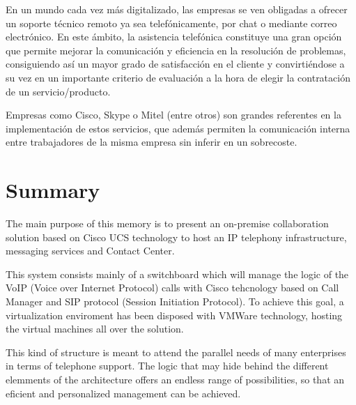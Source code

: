 \documentclass[a4paper, 12pt]{book}
\begin{document}
En un mundo cada vez más digitalizado, las empresas se ven obligadas a ofrecer un soporte técnico remoto ya sea telefónicamente, por chat o mediante correo electrónico. En este ámbito, la asistencia telefónica constituye una gran opción que permite mejorar la comunicación y eficiencia en la resolución de problemas, consiguiendo así un mayor grado de satisfacción en el cliente y convirtiéndose a su vez en un importante criterio de evaluación a la hora de elegir la contratación de un servicio/producto.

Empresas como Cisco, Skype o Mitel (entre otros) son grandes referentes en la implementación de estos servicios, que además permiten la comunicación interna entre trabajadores de la misma empresa sin inferir en un sobrecoste.


\chapter*{Summary}

The main purpose of this memory is to present an on-premise collaboration solution based on Cisco UCS technology to host an IP telephony infrastructure, messaging services and Contact Center.

This system consists mainly of a switchboard which will manage the logic of the VoIP (Voice over Internet Protocol) calls with Cisco tehcnology based on Call Manager and SIP protocol (Session Initiation Protocol). To achieve this goal, a virtualization enviroment has been disposed with VMWare technology, hosting the virtual machines all over the solution.

This kind of structure is meant to attend the parallel needs of many enterprises in terms of telephone support. The logic that may hide behind the different elemments of the architecture offers an endless range of possibilities, so that an eficient and personalized management can be achieved.
\end{document}
